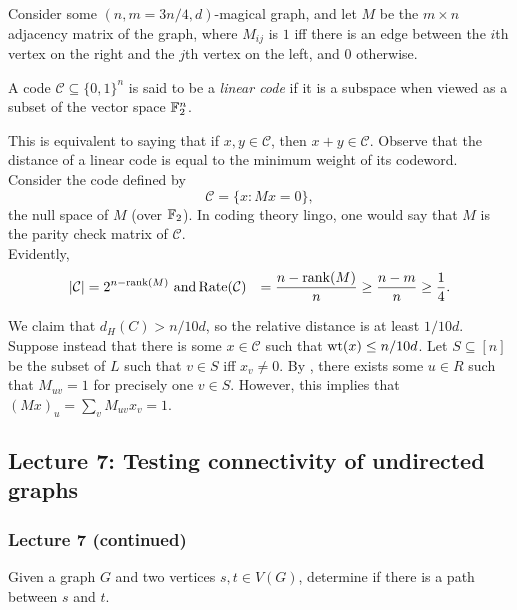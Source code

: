 			Consider some $(n,m=3n/4,d)$-magical graph, and let $M$ be the $m\times n$ adjacency matrix of the graph, where $M_{ij}$ is $1$ iff there is an edge between the $i$th vertex on the right and the $j$th vertex on the left, and $0$ otherwise.\\

			\begin{fdef}
				A code $\mathcal{C} \subseteq \{0,1\}^n$ is said to be a \emph{linear code} if it is a subspace when viewed as a subset of the vector space $\mathbb{F}_2^n$.
			\end{fdef}
			This is equivalent to saying that if $x,y \in \mathcal{C}$, then $x+y \in \mathcal{C}$. Observe that the distance of a linear code is equal to the minimum weight of its codeword. \\

			Consider the code defined by
			\[ \mathcal{C} = \{ x : Mx = 0 \}, \]
			the null space of $M$ (over $\mathbb{F}_2$). In coding theory lingo, one would say that $M$ is the parity check matrix of $\mathcal{C}$.\\
			Evidently,
			\begin{align*}
				|\mathcal{C}| &= 2^{n - \operatorname{rank}(M)} \text{ and}
				\operatorname{Rate}(\mathcal{C}) &= \frac{n-\operatorname{rank}(M)}{n} \ge \frac{n-m}{n} \ge \frac{1}{4}.
			\end{align*}

			We claim that $d_H(C) > n/10d$, so the relative distance is at least $1/10d$. Suppose instead that there is some $x \in \mathcal{C}$ such that $\operatorname{wt}(x) \le n/10d$. Let $S \subseteq [n]$ be the subset of $L$ such that $v \in S$ iff $x_v \ne 0$. By , there exists some $u \in R$ such that $M_{uv} = 1$ for precisely one $v \in S$. However, this implies that $(Mx)_u = \sum_v M_{uv} x_{v} = 1$.

	\subsection{Lecture 7: Testing connectivity of undirected graphs}

		\subsubsection{Lecture 7 (continued)}

			\begin{problem*}
				Given a graph $G$ and two vertices $s,t \in V(G)$, determine if there is a path between $s$ and $t$.
			\end{problem*}

